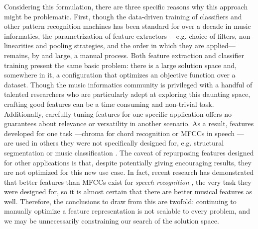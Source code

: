 Considering this formulation, there are three specific reasons why this approach might be problematic. 
First, though the data-driven training of classifiers and other pattern recognition machines has been standard for over a decade in music informatics, the parametrization of feature extractors ---e.g. choice of filters, non-linearities and pooling strategies, and the order in which they are applied--- remains, by and large, a manual process.
Both feature extraction and classifier training present the same basic problem: there is a large solution space and, somewhere in it, a configuration that optimizes an objective function over a dataset.
Though the music informatics community is privileged with a handful of talented researchers who are particularly adept at exploring this daunting space, crafting good features can be a time consuming and non-trivial task.
Additionally, carefully tuning features for one specific application offers no guarantees about relevance or versatility in another scenario.
As a result, features developed for one task ---chroma for chord recognition \cite{Fujishima1999} or MFCCs in speech \cite{Mermelstein1980}--- are used in others they were not specifically designed for, e.g. structural segmentation \cite{Levy2007} or music classification \cite{Mandel2005}. 
The caveat of repurposing features designed for other applications is that, despite potentially giving encouraging results, they are not optimized for this new use case.
In fact, recent research has demonstrated that better features than MFCCs exist for \emph{speech recognition} \cite{Hinton2012}, the very task they were designed for, so it is almost certain that there are better musical features as well.
Therefore, the conclusions to draw from this are twofold: continuing to manually optimize a feature representation is not scalable to every problem, and we may be unnecessarily constraining our search of the solution space.


